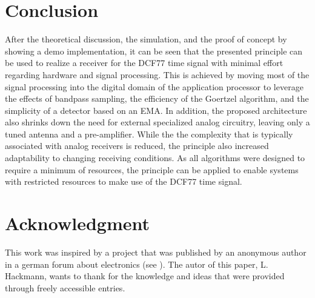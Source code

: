 \documentclass[conference]{IEEEtran}
\begin{document}
\section{Conclusion}
After the theoretical discussion, the simulation, and the proof of concept by showing a demo implementation, it can be seen that the presented principle can be used to realize a receiver for the DCF77 time signal with minimal effort regarding hardware and signal processing.
This is achieved by moving most of the signal processing into the digital domain of the application processor to leverage the effects of bandpass sampling, the efficiency of the Goertzel algorithm, and the simplicity of a detector based on an EMA.
In addition, the proposed architecture also shrinks down the need for external specialized analog circuitry, leaving only a tuned antenna and a pre-amplifier.
While the the complexity that is typically associated with analog receivers is reduced, the principle also increased adaptability to changing receiving conditions.
As all algorithms were designed to require a minimum of resources, the principle can be applied to enable systems with restricted resources to make use of the DCF77 time signal.

\section*{Acknowledgment}
This work was inspired by a project that was published by an anonymous author in a german forum about electronics (see \cite{b12}).
The autor of this paper, L. Hackmann, wants to thank for the knowledge and ideas that were provided through freely accessible entries.
\end{document}
